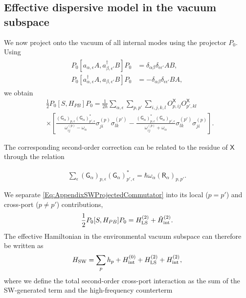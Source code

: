 \documentclass[prx,aps,twocolumn,article]{revtex4-2}
\newcommand{\msf}[1]{\mathsf{#1}}
\newcommand{\msG}{\msf{G}}
\newcommand{\msX}{\msf{X}}
\newcommand{\msR}{\msf{R}}
\begin{document}
\subsection{Effective dispersive model in the vacuum subspace}

We now project onto the vacuum of all internal modes using the projector $P_0$.
Using
\begin{align}
\begin{aligned}
    P_0[
        a_{\alpha,\epsilon}A,
        a_{\beta,\epsilon'}^\dagger B
    ]P_0
    &=
    \delta_{\alpha\beta}
    \delta_{\epsilon\epsilon'}
    AB,
    \\
    P_0[
        a_{\alpha,\epsilon}^\dagger A,
        a_{\beta,\epsilon'}B
    ]P_0
    &=
    -
    \delta_{\alpha\beta}
    \delta_{\epsilon\epsilon'}
    BA,
\end{aligned}
\end{align}
we obtain
\begin{align}
    &\frac12
    P_0[S,H_{PB}]P_0
    =
    \frac{1}{2\hbar}
    \sum_{\alpha,\epsilon}
    \sum_{p,p'}
    \sum_{i,j,k,l}
    O_{p,ij}^{\msX}
    O_{p',kl}^{\msX}\label{Eq:AppendixSWProjectedCommutator}
    \\
    &\times
    \left[
        \frac{
            (\msG_\alpha)_{p,\epsilon}
            (\msG_\alpha)_{p',\epsilon}^*
        }{
            \omega_{ij}^{(p)}
            -
            \omega_\alpha
        }
        \sigma_{ji}^{(p)}
        \sigma_{lk}^{(p')}
        -
        \frac{
            (\msG_\alpha)_{p,\epsilon}^*
            (\msG_\alpha)_{p',\epsilon}
        }{
            \omega_{ij}^{(p)}
            +
            \omega_\alpha
        }
        \sigma_{lk}^{(p')}
        \sigma_{ji}^{(p)}
    \right].\nonumber
\end{align}

The corresponding second-order correction can be related to the residue of $\msX$ through the relation

\begin{align}
    \sum_\epsilon
    (\msG_\alpha)_{p,\epsilon}
    (\msG_\alpha)_{p',\epsilon}^*
    =
    \hbar\omega_\alpha
    (\msR_\alpha)_{p,p'}.
\label{Eq:AppendixSWResidueIdentity}
\end{align}

We separate \cref{Eq:AppendixSWProjectedCommutator} into its local
($p=p'$) and cross-port ($p\neq p'$) contributions,
\begin{align}
    \frac12P_0[S,H_{PB}]P_0
    =
    H_{\rm LS}^{(2)}
    +
    \tilde{H}_{\rm int}^{(2)}.
\label{Eq:AppendixSWLocalCrossSplit}
\end{align}
The effective Hamiltonian in the environmental vacuum subspace can therefore be written as
\begin{align}
    H_{\rm SW}
    =
    \sum_p h_p
    +
    H_{\mathrm{int}}^{(0)}
    +
    H_{\rm LS}^{(2)}
    +
    H_{\rm int}^{(2)},
\label{Eq:AppendixSWEffectiveHamiltonian}
\end{align}
where we define the total second-order cross-port interaction as the sum of the SW-generated term and the high-frequency counterterm
\end{document}
